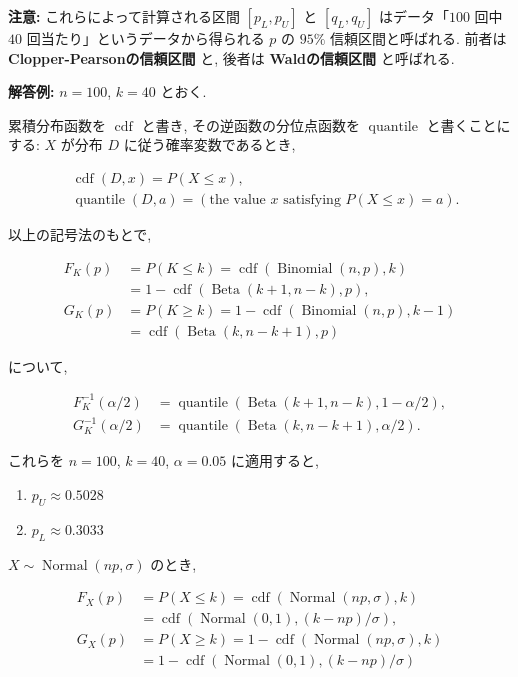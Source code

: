 \documentclass[
  letterpaper,
  DIV=11,
  numbers=noendperiod]{scrartcl}
\begin{document}
\textbf{注意:} これらによって計算される区間 \([p_L, p_U]\) と
\([q_L, q_U]\) はデータ「\(100\) 回中 \(40\)
回当たり」というデータから得られる \(p\) の \(95\%\) 信頼区間と呼ばれる.
前者は \textbf{Clopper-Pearsonの信頼区間} と, 後者は
\textbf{Waldの信頼区間} と呼ばれる.

\textbf{解答例:} \(n=100\), \(k=40\) とおく.

累積分布函数を \(\operatorname{cdf}\) と書き, その逆函数の分位点函数を
\(\operatorname{quantile}\) と書くことにする: \(X\) が分布 \(D\)
に従う確率変数であるとき,

\[
\begin{aligned}
&
\operatorname{cdf}(D, x) = P(X \le x),
\\ &
\operatorname{quantile}(D, a) = (\text{the value $x$ satisfying $P(X \le x) = a$}).
\end{aligned}
\]

以上の記号法のもとで,

\[
\begin{aligned}
F_K(p) &= P(K\le k) = \operatorname{cdf}(\operatorname{Binomial}(n,p), k)
\\ &=
1 - \operatorname{cdf}(\operatorname{Beta}(k+1, n-k), p),
\\
G_K(p) &= P(K\ge k) = 1 - \operatorname{cdf}(\operatorname{Binomial}(n,p), k-1)
\\ &= \operatorname{cdf}(\operatorname{Beta}(k, n-k+1), p)
\end{aligned}
\]

について,

\[
\begin{aligned}
F_K^{-1}(\alpha/2) &= \operatorname{quantile}(\operatorname{Beta}(k+1, n-k), 1 - \alpha/2),
\\
G_K^{-1}(\alpha/2) &= \operatorname{quantile}(\operatorname{Beta}(k, n-k+1), \alpha/2).
\end{aligned}
\]

これらを \(n=100\), \(k=40\), \(\alpha=0.05\) に適用すると,

\begin{enumerate}
\def\labelenumi{(\arabic{enumi})}
\item
  \(p_U \approx 0.5028\)
\item
  \(p_L \approx 0.3033\)
\end{enumerate}

\(X\sim\operatorname{Normal}(np, \sigma)\) のとき,

\[
\begin{aligned}
F_X(p) &= P(X\le k) = \operatorname{cdf}(\operatorname{Normal}(np, \sigma), k)
\\ &=
\operatorname{cdf}(\operatorname{Normal}(0,1), (k-np)/\sigma),
\\
G_X(p) &= P(X\ge k) = 1 - \operatorname{cdf}(\operatorname{Normal}(np, \sigma), k)
\\ &=
1 - \operatorname{cdf}(\operatorname{Normal}(0,1), (k-np)/\sigma)
\end{aligned}
\]
\end{document}
